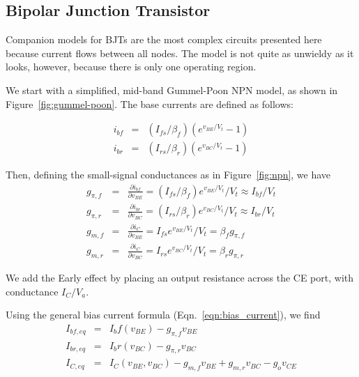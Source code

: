 \documentclass{article}
\begin{document}
\pagebreak

\subsection{Bipolar Junction Transistor}

Companion models for BJTs are the most complex circuits presented here because current flows between all nodes. The model is not quite as unwieldy as it looks, however, because there is only one operating region.

We start with a simplified, mid-band Gummel-Poon NPN model, as shown in Figure~\ref{fig:gummel-poon}. The base currents are defined as follows:

\begin{eqnarray}
i_{bf}&=&(I_{fs}/\beta_f)(e^{v_{BE}/V_t}-1) \\
i_{br}&=&(I_{rs}/\beta_r)(e^{v_{BC}/V_t}-1)
\end{eqnarray}

Then, defining the small-signal conductances as in Figure~\ref{fig:npn}, we have
\begin{eqnarray}
g_{\pi,f}&=&\frac{\partial i_{bf}}{\partial v_{BE}}=(I_{fs}/\beta_f)e^{v_{BE}/V_t}/V_t \approx I_{bf}/V_t \\
g_{\pi,r}&=&\frac{\partial i_{br}}{\partial v_{BC}}=(I_{rs}/\beta_r)e^{v_{BC}/V_t}/V_t \approx I_{br}/V_t \\
g_{m,f}&=&\frac{\partial i_C}{\partial v_{BE}}=I_{fs}e^{v_{BE}/V_t}/V_t=\beta_fg_{\pi,f} \\
g_{m,r}&=&\frac{\partial i_C}{\partial v_{BC}}=I_{rs}e^{v_{BC}/V_t}/V_t=\beta_rg_{\pi,r}
\end{eqnarray}

We add the Early effect by placing an output resistance across the CE port, with conductance $I_C/V_a$.

Using the general bias current formula (Eqn.~\ref{eqn:bias_current}), we find
\begin{eqnarray}
I_{bf,eq}&=&I_bf(v_{BE})-g_{\pi,f}v_{BE} \\
I_{br,eq}&=&I_br(v_{BC})-g_{\pi,r}v_{BC} \\
I_{C,eq}&=&I_C(v_{BE},v_{BC})-g_{m,f}v_{BE}+g_{m,r}v_{BC}-g_ov_{CE}
\end{eqnarray}
\end{document}
